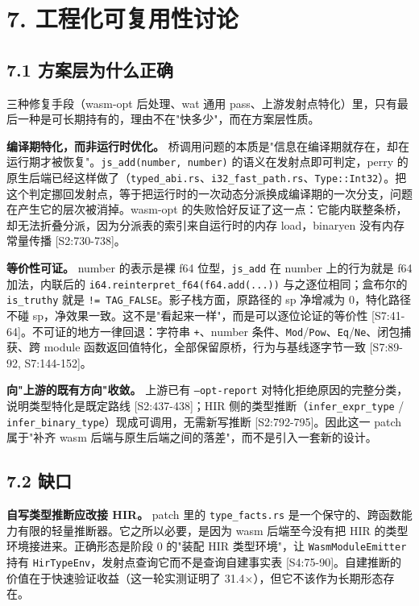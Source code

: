 \documentclass[11pt, a4paper]{article}
\begin{document}
\section{7. 工程化可复用性讨论}

\subsection{7.1 方案层为什么正确}

三种修复手段（wasm-opt 后处理、wat 通用 pass、上游发射点特化）里，只有最后一种是可长期持有的，理由不在"快多少"，而在方案层性质。


\textbf{编译期特化，而非运行时优化。} 桥调用问题的本质是"信息在编译期就存在，却在运行期才被恢复"。\texttt{js\_add(number, number)} 的语义在发射点即可判定，perry 的原生后端已经这样做了（\texttt{typed\_abi.rs}、\texttt{i32\_fast\_path.rs}、\texttt{Type::Int32}）。把这个判定挪回发射点，等于把运行时的一次动态分派换成编译期的一次分支，问题在产生它的层次被消掉。wasm-opt 的失败恰好反证了这一点：它能内联整条桥，却无法折叠分派，因为分派表的索引来自运行时的内存 load，binaryen 没有内存常量传播 [S2:730-738]。


\textbf{等价性可证。} number 的表示是裸 f64 位型，\texttt{js\_add} 在 number 上的行为就是 f64 加法，内联后的 \texttt{i64.reinterpret\_f64(f64.add(...))} 与之逐位相同；盒布尔的 \texttt{is\_truthy} 就是 \texttt{!= TAG\_FALSE}。影子栈方面，原路径的 sp 净增减为 0，特化路径不碰 sp，净效果一致。这不是"看起来一样"，而是可以逐位论证的等价性 [S7:41-64]。不可证的地方一律回退：字符串 \texttt{+}、number 条件、\texttt{Mod}/\texttt{Pow}、\texttt{Eq}/\texttt{Ne}、闭包捕获、跨 module 函数返回值特化，全部保留原桥，行为与基线逐字节一致 [S7:89-92, S7:144-152]。


\textbf{向"上游的既有方向"收敛。} 上游已有 \texttt{--opt-report} 对特化拒绝原因的完整分类，说明类型特化是既定路线 [S2:437-438]；HIR 侧的类型推断（\texttt{infer\_expr\_type} / \texttt{infer\_binary\_type}）现成可调用，无需新写推断 [S2:792-795]。因此这一 patch 属于"补齐 wasm 后端与原生后端之间的落差"，而不是引入一套新的设计。


\subsection{7.2 缺口}

\textbf{自写类型推断应改接 HIR。} patch 里的 \texttt{type\_facts.rs} 是一个保守的、跨函数能力有限的轻量推断器。它之所以必要，是因为 wasm 后端至今没有把 HIR 的类型环境接进来。正确形态是阶段 0 的"装配 HIR 类型环境"，让 \texttt{WasmModuleEmitter} 持有 \texttt{HirTypeEnv}，发射点查询它而不是查询自建事实表 [S4:75-90]。自建推断的价值在于快速验证收益（这一轮实测证明了 31.4×），但它不该作为长期形态存在。
\end{document}
